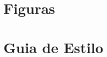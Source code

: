 \begin{anexosenv}

\partanexos


\chapter{\nmu Figuras}
\label{anexos}

\chapter{Guia de Estilo} %


\end{anexosenv}

